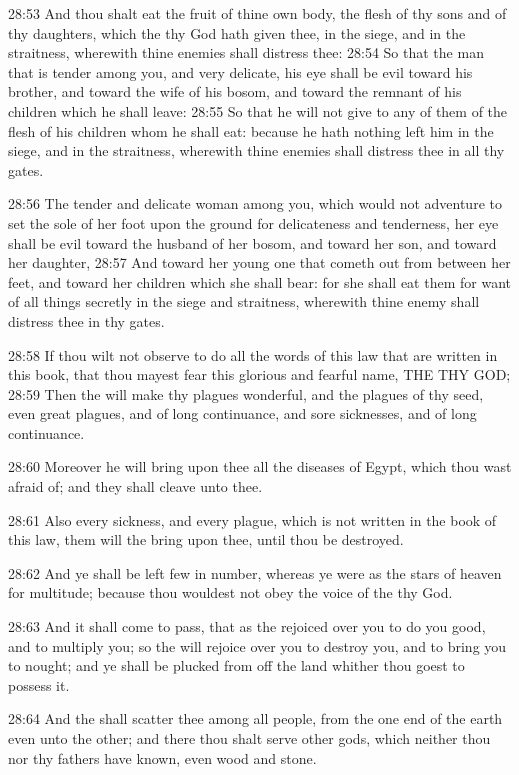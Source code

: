 28:53 And thou shalt eat the fruit of thine own body, the flesh of thy
sons and of thy daughters, which the \LORD thy God hath given thee, in
the siege, and in the straitness, wherewith thine enemies shall
distress thee: 28:54 So that the man that is tender among you, and
very delicate, his eye shall be evil toward his brother, and toward
the wife of his bosom, and toward the remnant of his children which he
shall leave: 28:55 So that he will not give to any of them of the
flesh of his children whom he shall eat: because he hath nothing left
him in the siege, and in the straitness, wherewith thine enemies shall
distress thee in all thy gates.

28:56 The tender and delicate woman among you, which would not
adventure to set the sole of her foot upon the ground for delicateness
and tenderness, her eye shall be evil toward the husband of her bosom,
and toward her son, and toward her daughter, 28:57 And toward her
young one that cometh out from between her feet, and toward her
children which she shall bear: for she shall eat them for want of all
things secretly in the siege and straitness, wherewith thine enemy
shall distress thee in thy gates.

28:58 If thou wilt not observe to do all the words of this law that
are written in this book, that thou mayest fear this glorious and
fearful name, THE \LORD THY GOD; 28:59 Then the \LORD will make thy
plagues wonderful, and the plagues of thy seed, even great plagues,
and of long continuance, and sore sicknesses, and of long continuance.

28:60 Moreover he will bring upon thee all the diseases of Egypt,
which thou wast afraid of; and they shall cleave unto thee.

28:61 Also every sickness, and every plague, which is not written in
the book of this law, them will the \LORD bring upon thee, until thou
be destroyed.

28:62 And ye shall be left few in number, whereas ye were as the stars
of heaven for multitude; because thou wouldest not obey the voice of
the \LORD thy God.

28:63 And it shall come to pass, that as the \LORD rejoiced over you to
do you good, and to multiply you; so the \LORD will rejoice over you to
destroy you, and to bring you to nought; and ye shall be plucked from
off the land whither thou goest to possess it.

28:64 And the \LORD shall scatter thee among all people, from the one
end of the earth even unto the other; and there thou shalt serve other
gods, which neither thou nor thy fathers have known, even wood and
stone.

